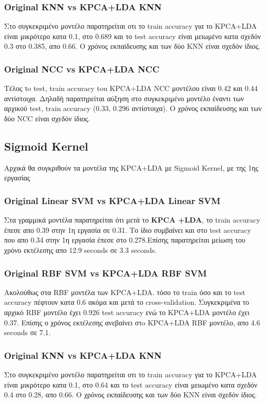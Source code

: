 \subsubsection{Original KNN vs KPCA+LDA KNN}
Στο συγκεκριμένο μοντέλο παρατηρείται οτι το train accuracy για το KPCA+LDA είναι μικρότερο κατα 0.1, στο 0.689 και το test accuracy είναι μειωμένο κατα σχεδόν 0.3 στο 0.385, απο 0.66.
Ο χρόνος εκπαίδευσης και των δύο KNN είναι σχεδόν ίδιος.
\subsubsection{Original NCC vs KPCA+LDA NCC}
Τέλος τo test, train accuracy tou KPCA+LDA NCC μοντέλου είναι 0.42 και 0.44 αντίστοιχα. Δηλαδή παρατηρείται αύξηση στο συγκεκριμένο μοντέλο έναντι των αρχικού test, train accuracy
(0.33, 0.296 αντίστοιχα). Ο χρόνος εκπαίδευσης και των δύο NCC είναι σχεδόν ίδιος.

\subsection{Sigmoid Kernel}
Αρχικά θα συγκριθούν τα μοντέλα της KPCA+LDA με Sigmoid Kernel, με της 1ης εργασίας
\subsubsection{Original Linear SVM vs KPCA+LDA Linear SVM}
Στα γραμμικά μοντέλα παρατηρείται ότι μετά το \textbf{KPCA +LDA}, το train accuracy έπεσε απο 0.39 στην 1η εργασία σε 0.31. Το ίδιο συμβαίνει και στο test accuracy που απο 0.34 στην 1η εργασία έπεσε στο 0.278.Επίσης παρατηρείται μείωση του χρόνο εκτέλεσης απο 12.9 seconds σε 3.3 seconds.
\subsubsection{Original RBF SVM vs KPCA+LDA RBF SVM}
Ακολούθως στα RBF μοντέλα των KPCA+LDA. τόσο το train όσο και το test accuracy πέφτουν κατα 0.6 ακόμα και μετά το cross-validation. Συγκεκριμένα το αρχικό RBF μοντέλο έχει 0.926 test accuracy ενώ το KPCA+LDA μοντέλο έχει 0.37. Επίσης ο χρόνος εκτέλεσης ανεβαίνει στo KPCA+LDA RBF μοντέλο, απο 4.6 seconds σε 7.1.
\subsubsection{Original KNN vs KPCA+LDA KNN}
Στο συγκεκριμένο μοντέλο παρατηρείται οτι το train accuracy για το KPCA+LDA είναι μικρότερο κατα 0.1, στο 0.64 και το test accuracy είναι μειωμένο κατα σχεδόν 0.4 στο 0.28, απο 0.66.
Ο χρόνος εκπαίδευσης και των δύο KNN είναι σχεδόν ίδιος.
